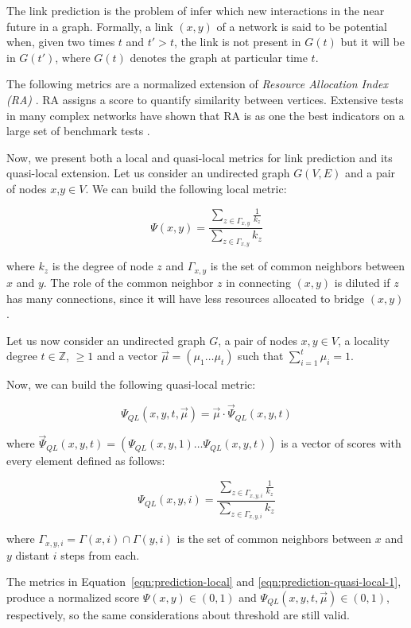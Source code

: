 The link prediction is the problem of infer which new interactions in the near future in a graph. Formally, a link $(x,y)$ of a network is said to be potential when, given two times $t$ and $t'>t$, the link is not present in $G(t)$ but it will be in $G(t')$, where $G(t)$ denotes the graph at particular time $t$. 

The following metrics are a normalized extension of \textit{Resource Allocation Index (RA)} \cite{berlusconi2016link, Lu2011,zhou2009predicting}. RA assigns a score to quantify similarity between vertices. Extensive tests in many complex networks have shown that RA is as one the best indicators on a large set of benchmark tests  \cite{berlusconi2016link,Lu2011}.

Now, we present both a local and quasi-local metrics for link prediction and its quasi-local extension.
Let us consider an undirected graph $G(V,E)$ and a pair of nodes $x$,$y\in V$. We can build the following local metric:

\begin{equation}
\label{eqn:prediction-local}
\Psi(x,y)=
\frac{\sum\limits_{z\in\Gamma_{x,y}}\frac{1}{k_{z}}}
{\sum\limits_{z\in\Gamma_{x,y}}k_{z}}
\end{equation}

where $k_{z}$ is the degree of node $z$ and $\Gamma_{x,y}$ is the set of common neighbors between $x$ and $y$. The role of the common neighbor $z$ in connecting $(x, y)$ is diluted if $z$ has many connections, since it will have less resources allocated to bridge $(x, y)$ \cite{berlusconi2016link}.

Let us now consider an undirected graph $G$, a pair of nodes $x,y\in V$, a locality degree $t\in \mathbb{Z}$, $\geq 1$ and a vector $\vec{\mu}=(\mu_{1}\ldots\mu_{t})$ such that $\sum_{i=1}^{t}\mu_{i}=1$. 

Now, we can build the following quasi-local metric:

\begin{equation}
\label{eqn:prediction-quasi-local-1}
\Psi_{QL}(x,y,t,\vec{\mu})=\vec{\mu}\cdot\vec{\Psi}_{QL}(x,y,t)
\end{equation}

where $\vec{\Psi}_{QL}(x,y,t)=(\Psi_{QL}(x,y,1)\ldots\Psi_{QL}(x,y,t))$ is a vector of scores with every element defined as follows:

\begin{equation}
\label{eqn:prediction-quasi-local-2}
\Psi_{QL}(x,y,i)=
\frac{\sum\limits_{z\in \Gamma_{x,y,i}}\frac{1}{k_{z}}}
{\sum\limits_{z\in\Gamma_{x,y,i}}k_{z}}
\end{equation}

where $\Gamma_{x,y,i} = \Gamma(x,i) \cap \Gamma(y,i)$ is the set of common neighbors between $x$ and $y$ distant $i$ steps from each.

The metrics in Equation~\ref{eqn:prediction-local} and  \ref{eqn:prediction-quasi-local-1}, produce a normalized score $\Psi(x,y) \in (0,1)$ and $\Psi_{QL}(x,y,t,\vec{\mu}) \in (0,1)$, respectively, so the same considerations about  threshold are still valid. 